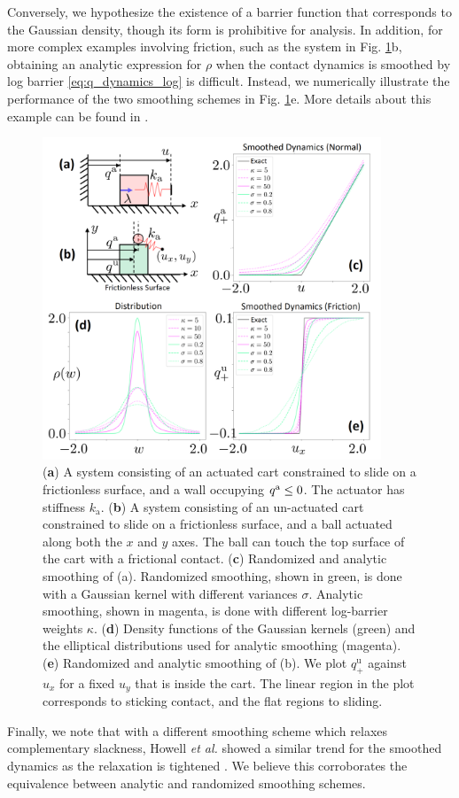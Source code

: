 Conversely, we hypothesize the existence of a barrier function that corresponds to the Gaussian density, though its form is prohibitive for analysis. In addition, for more complex examples involving friction, such as the system in Fig. \ref{fig:equivalence}b, obtaining an analytic expression for $\rho$ when the contact dynamics is smoothed by log barrier \eqref{eq:q_dynamics_log} is difficult. Instead, we numerically illustrate the performance of the two smoothing schemes in Fig. \ref{fig:equivalence}e. More details about this example can be found in \cite{bundledgradients}.
\begin{figure}
\centering
\includegraphics[width = 0.90\textwidth]{figures/02_quasi_static_dynamics/equivalence.png}
\caption{
(\textbf{a}) A system consisting of an actuated cart constrained to slide on a frictionless surface, and a wall occupying ${q^\mathrm{a}} \leq 0$. The actuator has stiffness $k_\textrm{a}$.
(\textbf{b}) A system consisting of an un-actuated cart constrained to slide on a frictionless surface, and a ball actuated along both the $x$ and $y$ axes. The ball can touch the top surface of the cart with a frictional contact.
(\textbf{c}) Randomized and analytic smoothing of (a). Randomized smoothing, shown in green, is done with a Gaussian kernel with different variances $\sigma$. Analytic smoothing, shown in magenta, is done with different log-barrier weights $\kappa$. 
(\textbf{d}) Density functions of the Gaussian kernels (green) and the elliptical distributions used for analytic smoothing (magenta). 
(\textbf{e}) Randomized and analytic smoothing of (b). We plot $q^\mathrm{u}_+$ against $u_x$ for a fixed $u_y$ that is inside the cart. The linear region in the plot corresponds to sticking contact, and the flat regions to sliding.}
\label{fig:equivalence}
\end{figure}


Finally, we note that with a different smoothing scheme which relaxes complementary slackness, Howell \textit{et al.} showed a similar trend for the smoothed dynamics as the relaxation is tightened \cite[Fig. 7]{howell2022dojo}. We believe this corroborates the equivalence between analytic and randomized smoothing schemes.


